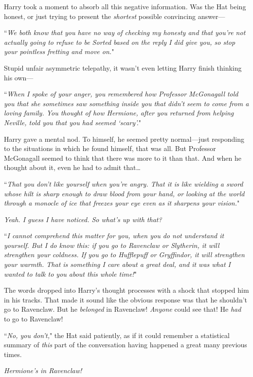 Harry took a moment to absorb all this negative information. Was the Hat being honest, or just trying to present the \emph{shortest} possible convincing answer—

``\emph{We both know that you have no way of checking my honesty and that you're not actually going to refuse to be Sorted based on the reply I did give you, so stop your pointless fretting and move on.}"

Stupid unfair asymmetric telepathy, it wasn't even letting Harry finish thinking his own—

``\emph{When I spoke of your anger, you remembered how Professor McGonagall told you that she sometimes saw something inside you that didn't seem to come from a loving family. You thought of how Hermione, after you returned from helping Neville, told you that you had seemed `scary'.}"

Harry gave a mental nod. To himself, he seemed pretty normal—just responding to the situations in which he found himself, that was all. But Professor McGonagall seemed to think that there was more to it than that. And when he thought about it, even he had to admit that{\ldots}

``\emph{That you don't like yourself when you're angry. That it is like wielding a sword whose hilt is sharp enough to draw blood from your hand, or looking at the world through a monocle of ice that freezes your eye even as it sharpens your vision.}"

\emph{Yeah. I guess I have noticed. So what's up with that?}

``\emph{I cannot comprehend this matter for you, when you do not understand it yourself. But I do know this: if you go to Ravenclaw or Slytherin, it will strengthen your coldness. If you go to Hufflepuff or Gryffindor, it will strengthen your warmth. \emph{That} is something I care about a great deal, and it was what I wanted to talk to you about this whole time!}"

The words dropped into Harry's thought processes with a shock that stopped him in his tracks. That made it sound like the obvious response was that he shouldn't go to Ravenclaw. But he \emph{belonged} in Ravenclaw! \emph{Anyone} could see that! He \emph{had} to go to Ravenclaw!

``\emph{No, you don't,}" the Hat said patiently, as if it could remember a statistical summary of \emph{this} part of the conversation having happened a great many previous times.

\emph{Hermione's in Ravenclaw!}

